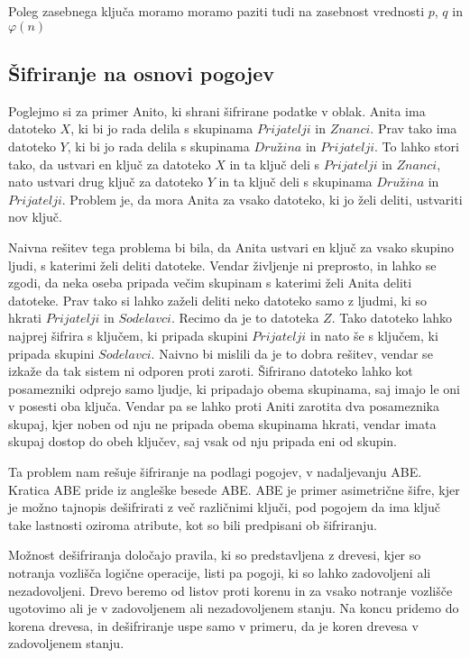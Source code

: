 \documentclass[12pt,a4paper,openany]{book}
\begin{document}
Poleg zasebnega ključa moramo moramo paziti tudi na zasebnost vrednosti $p$, $q$ in $\varphi(n)$



\subsection{Šifriranje na osnovi pogojev}

Poglejmo si za primer Anito, ki shrani šifrirane podatke v oblak. Anita ima datoteko $X$, ki bi jo rada delila s skupinama $Prijatelji$ in $Znanci$. Prav tako ima datoteko $Y$, ki bi jo rada delila s skupinama $Družina$ in $Prijatelji$. To lahko stori tako, da ustvari en ključ za datoteko $X$ in ta ključ deli s $Prijatelji$ in $Znanci$, nato ustvari drug ključ za datoteko $Y$ in ta ključ deli s skupinama $Družina$ in $Prijatelji$. Problem je, da mora Anita za vsako datoteko, ki jo želi deliti, ustvariti nov ključ.

Naivna rešitev tega problema bi bila, da Anita ustvari en ključ za vsako skupino ljudi, s katerimi želi deliti datoteke. Vendar življenje ni preprosto, in lahko se zgodi, da neka oseba pripada večim skupinam s katerimi želi Anita deliti datoteke. Prav tako si lahko zaželi deliti neko datoteko samo z ljudmi, ki so hkrati $Prijatelji$ in $Sodelavci$. Recimo da je to datoteka $Z$. Tako datoteko lahko najprej šifrira s ključem, ki pripada skupini $Prijatelji$ in nato še s ključem, ki pripada skupini $Sodelavci$. Naivno bi mislili da je to dobra rešitev, vendar se izkaže da tak sistem ni odporen proti zaroti. Šifrirano datoteko lahko kot posamezniki odprejo samo ljudje, ki pripadajo obema skupinama, saj imajo le oni v posesti oba ključa. Vendar pa se lahko proti Aniti zarotita dva posameznika skupaj, kjer noben od nju ne pripada obema skupinama hkrati, vendar imata skupaj dostop do obeh ključev, saj vsak od nju pripada eni od skupin.

Ta problem nam rešuje šifriranje na podlagi pogojev, v nadaljevanju ABE. Kratica ABE pride iz angleške besede \gls{ABE}. ABE je primer asimetrične šifre, kjer je možno tajnopis dešifrirati z več različnimi ključi, pod pogojem da ima ključ take lastnosti oziroma atribute, kot so bili predpisani ob šifriranju.

Možnost dešifriranja določajo pravila, ki so predstavljena z drevesi, kjer so notranja vozlišča logične operacije, listi pa pogoji, ki so lahko zadovoljeni ali nezadovoljeni. Drevo beremo od listov proti korenu in za vsako notranje vozlišče ugotovimo ali je v zadovoljenem ali nezadovoljenem stanju. Na koncu pridemo do korena drevesa, in dešifriranje uspe samo v primeru, da je koren drevesa v zadovoljenem stanju.
\end{document}

